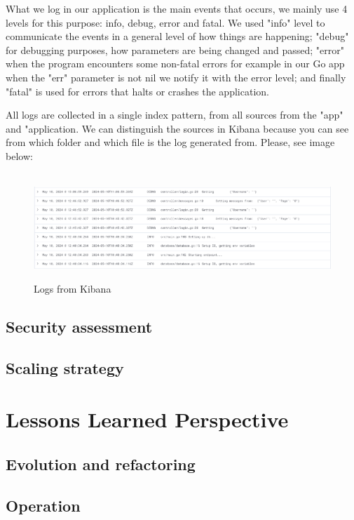 \documentclass[12pt, a4paper, oneside]{book}
\begin{document}
\begin{spacing}{1.5}
What we log in our application is the main events that occurs, we mainly use 4 levels for this purpose: info, debug, error and fatal. We used "info" level to communicate the events in a general level of how things are happening; "debug" for debugging purposes, how parameters are being changed and passed; "error" when the program encounters some non-fatal errors for example in our Go app when the "err" parameter is not nil we notify it with the error level; and finally "fatal" is used for errors that halts or crashes the application. \bigskip

All logs are collected in a single index pattern, from all sources from the "app" and "application. We can distinguish the sources in Kibana because you can see from which folder and which file is the log generated from. Please, see image below:
\begin{figure}
    \centering
    \hbox{\hspace{-5em}
    \includegraphics[scale = 0.6]{images/kibana.png}}
    \caption{Logs from Kibana}
    \label{fig:kabana-logs}
\end{figure}
\section{Security assessment}

\section{Scaling strategy}

\chapter{Lessons Learned Perspective}

\section{Evolution and refactoring}

\section{Operation}


\end{spacing}
\end{document}
